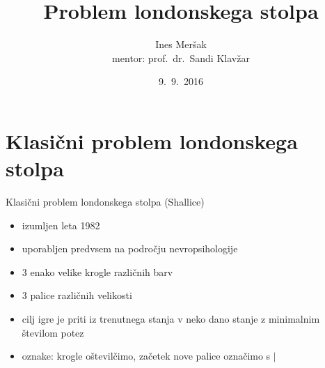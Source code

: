 \documentclass[dvipsnames]{beamer}
\title{Problem londonskega stolpa}
\author[Ines Meršak]{Ines Meršak \\[5px] mentor: prof.~dr.~Sandi Klavžar}
\date{9.~9.~2016}
\begin{document}
    
\begin{frame}[plain]
    \titlepage
\end{frame}


\section{Klasični problem londonskega stolpa}
\begin{frame}{Klasični problem londonskega stolpa (Shallice)}
    \begin{itemize}
        \item izumljen leta 1982
        \item uporabljen predvsem na področju nevropsihologije
        \item 3 enako velike krogle različnih barv
        \item 3 palice različnih velikosti
        \item cilj igre je priti iz trenutnega stanja v neko dano stanje z minimalnim številom potez
        \item oznake: krogle oštevilčimo, začetek nove palice označimo s $|$
    \end{itemize}
\end{frame}
\end{document}
